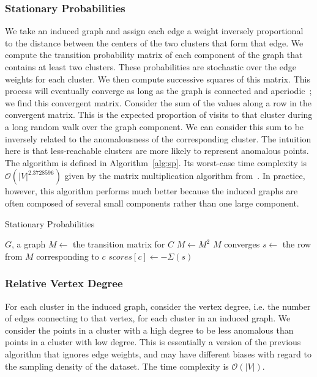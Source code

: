 \subsubsection{Stationary Probabilities}
\label{subsubsec:methods:individual-algorithms:sp}
We take an induced graph and assign each edge a weight inversely proportional to the distance between the centers of the two clusters that form that edge.
We compute the transition probability matrix of each component of the graph that contains at least two clusters.
These probabilities are stochastic over the edge weights for each cluster.
We then compute successive squares of this matrix.
This process will eventually converge as long as the graph is connected and aperiodic~\cite{levin2017markov}; we find this convergent matrix.
Consider the sum of the values along a row in the convergent matrix.
This is the expected proportion of visits to that cluster during a long random walk over the graph component.
We can consider this sum to be inversely related to the anomalousness of the corresponding cluster.
The intuition here is that less-reachable clusters are more likely to represent anomalous points.
The algorithm is defined in Algorithm~\ref{alg:sp}.
Its worst-case time complexity is $\mathcal{O}(|V|^{2.3728596})$ given by the matrix multiplication algorithm from~\cite{alman2021refined}.
In practice, however, this algorithm performs much better because the induced graphs are often composed of several small components rather than one large component.

\begin{algorithm}[h]
    \caption{Stationary Probabilities}
    \label{alg:sp}
\begin{algorithmic}[1]
    \REQUIRE $G$, a graph
        \STATE $M \gets$ the transition matrix for $C$
        \REPEAT
            \STATE $M \gets M^2$
        \UNTIL $M$ converges
            \STATE $s \gets $ the row from $M$ corresponding to $c$
            \STATE $scores[c] \gets -\Sigma(s)$ 
        \ENDFOR
    \ENDFOR
\end{algorithmic}
\end{algorithm}


\subsubsection{Relative Vertex Degree}
\label{subsubsec:methods:individual-algorithms:rvd}
For each cluster in the induced graph, consider the vertex degree, i.e. the number of edges connecting to that vertex, for each cluster in an induced graph.
We consider the points in a cluster with a high degree to be less anomalous than points in a cluster with low degree.
This is essentially a version of the previous algorithm that ignores edge weights, and may have different biases with regard to the sampling density of the dataset.
The time complexity is $\mathcal{O}(|V|)$.

